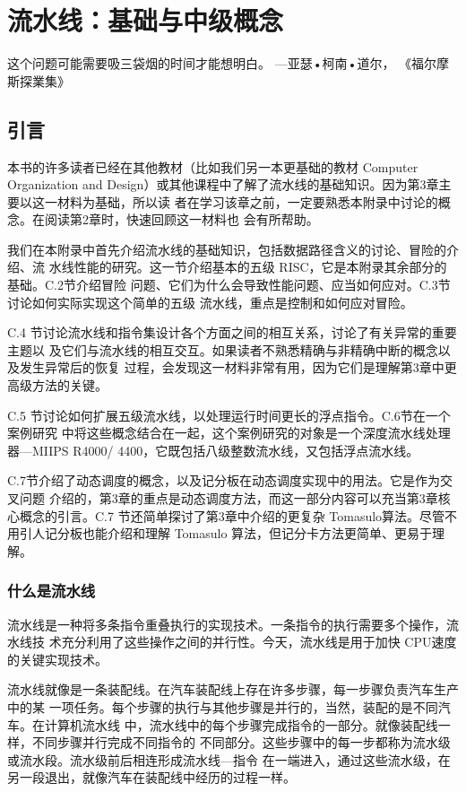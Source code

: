 \chapter{流水线：基础与中级概念}

这个问题可能需要吸三袋烟的时间才能想明白。
—亚瑟•柯南•道尔，
《福尔摩斯探業集》

\section{引言}
本书的许多读者已经在其他教材（比如我们另一本更基础的教材 Computer Organization and
Design）或其他课程中了解了流水线的基础知识。因为第3章主要以这一材料为基础，所以读
者在学习该章之前，一定要熟悉本附录中讨论的概念。在阅读第2章时，快速回顾这一材料也
会有所帮助。

我们在本附录中首先介绍流水线的基础知识，包括数据路径含义的讨论、冒险的介绍、流
水线性能的研究。这一节介绍基本的五级 RISC，它是本附录其余部分的基础。C.2节介绍冒险
问题、它们为什么会导致性能问题、应当如何应对。C.3节讨论如何实际实现这个简单的五级
流水线，重点是控制和如何应对冒险。

C.4 节讨论流水线和指令集设计各个方面之间的相互关系，讨论了有关异常的重要主题以
及它们与流水线的相互交互。如果读者不熟悉精确与非精确中断的概念以及发生异常后的恢复
过程，会发现这一材料非常有用，因为它们是理解第3章中更高级方法的关键。

C.5 节讨论如何扩展五级流水线，以处理运行时间更长的浮点指令。C.6节在一个案例研究
中将这些概念结合在一起，这个案例研究的对象是一个深度流水线处理器—MIIPS R4000/
4400，它既包括八级整数流水线，又包括浮点流水线。

C.7节介绍了动态调度的概念，以及记分板在动态调度实现中的用法。它是作为交叉问题
介绍的，第3章的重点是动态调度方法，而这一部分内容可以充当第3章核心概念的引言。C.7
节还简单探讨了第3章中介绍的更复杂 Tomasulo算法。尽管不用引人记分板也能介绍和理解
Tomasulo 算法，但记分卡方法更简单、更易于理解。

\subsection{什么是流水线}

流水线是一种将多条指令重叠执行的实现技术。一条指令的执行需要多个操作，流水线技
术充分利用了这些操作之间的并行性。今天，流水线是用于加快 CPU速度的关键实现技术。

流水线就像是一条装配线。在汽车装配线上存在许多步骤，每一步骤负责汽车生产中的某
一项任务。每个步骤的执行与其他步骤是并行的，当然，装配的是不同汽车。在计算机流水线
中，流水线中的每个步骤完成指令的一部分。就像装配线一样，不同步骤并行完成不同指令的
不同部分。这些步骤中的每一步都称为流水级或流水段。流水级前后相连形成流水线—指令
在一端进入，通过这些流水级，在另一段退出，就像汽车在装配线中经历的过程一样。

